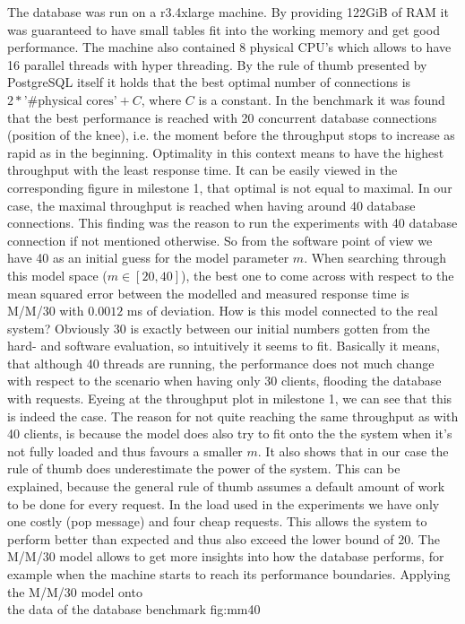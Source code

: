 \documentclass[11pt]{article}
\newcommand\TwoFig[6]{%
	\sbox\IBoxA{\texttt{[image: \#1]}}
	\sbox\IBoxB{\texttt{[image: \#4]}}%
	\ifdim\ht\IBoxA>\ht\IBoxB
	\setlength\IHeight{\ht\IBoxB}\else\setlength\IHeight{\ht\IBoxA}\fi%
	\begin{figure}[!htb]
		\minipage[t]{0.5\textwidth}\centering
		\texttt{[image: \#1]}
		\caption{#2}\label{#3}
		\endminipage \hfill
		\minipage[t]{0.5\textwidth}\centering
		\texttt{[image: \#4]}
		\caption{#5}\label{#6}
		\endminipage
	\end{figure}%
}
\begin{document}
The database was run on a r3.4xlarge machine. By providing 122GiB of RAM it was guaranteed to have small tables fit into the working memory and get good performance. The machine also contained 8 physical CPU's which allows to have 16 parallel threads with hyper threading. By the rule of thumb presented by PostgreSQL itself it holds that the best optimal number of connections is $2*\text{'\#physical cores'}+C$, where $C$ is a constant. In the benchmark it was found that the best performance is reached with 20 concurrent database connections (position of the knee), i.e. the moment before the throughput stops to increase as rapid as in the beginning. Optimality in this context means to have the highest throughput with the least response time. It can be easily viewed in the corresponding figure in milestone 1, that optimal is not equal to maximal. In our case, the maximal throughput is reached when having around 40 database connections. This finding was the reason to run the experiments with 40 database connection if not mentioned otherwise. So from the software point of view we have 40 as an initial guess for the model parameter $m$. When searching through this model space ($m\in[20, 40]$), the best one to come across with respect to the mean squared error between the modelled and measured response time is M/M/30 with $0.0012$ ms of deviation. How is this model connected to the real system? Obviously 30 is exactly between our initial numbers gotten from the hard- and software evaluation, so intuitively it seems to fit. Basically it means, that although 40 threads are running, the performance does not much change with respect to the scenario when having only 30 clients, flooding the database with requests. Eyeing at the throughput plot in milestone 1, we can see that this is indeed the case. The reason for not quite reaching the same throughput as with 40 clients, is because the model does also try to fit onto the the system when it's not fully loaded and thus favours a smaller $m$. It also shows that in our case the rule of thumb does underestimate the power of the system. This can be explained, because the general rule of thumb assumes a default amount of work to be done for every request. In the load used in the experiments we have only one costly (pop message) and four cheap requests. This allows the system to perform better than expected and thus also exceed the lower bound of 20. The M/M/30 model allows to get more insights into how the database performs, for example when the machine starts to reach its performance boundaries.
 {Applying the M/M/30 model onto\\ the data of the database benchmark} {fig:mm40}
\end{document}
